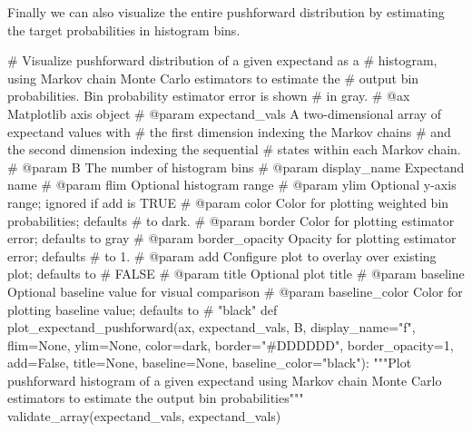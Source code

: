 \documentclass[
  letterpaper,
  DIV=11,
  numbers=noendperiod]{scrartcl}
\newenvironment{Shaded}{\begin{snugshade}}{\end{snugshade}}
\newcommand{\CommentTok}[1]{\textcolor[rgb]{0.37,0.37,0.37}{#1}}
\newcommand{\DecValTok}[1]{\textcolor[rgb]{0.68,0.00,0.00}{#1}}
\newcommand{\KeywordTok}[1]{\textcolor[rgb]{0.00,0.23,0.31}{#1}}
\newcommand{\NormalTok}[1]{\textcolor[rgb]{0.00,0.23,0.31}{#1}}
\newcommand{\OperatorTok}[1]{\textcolor[rgb]{0.37,0.37,0.37}{#1}}
\newcommand{\StringTok}[1]{\textcolor[rgb]{0.13,0.47,0.30}{#1}}
\newcommand{\VariableTok}[1]{\textcolor[rgb]{0.07,0.07,0.07}{#1}}
\begin{document}
Finally we can also visualize the entire pushforward distribution by
estimating the target probabilities in histogram bins.

\begin{Shaded}
\begin{Highlighting}[]
\CommentTok{\# Visualize pushforward distribution of a given expectand as a}
\CommentTok{\# histogram, using Markov chain Monte Carlo estimators to estimate the}
\CommentTok{\# output bin probabilities.  Bin probability estimator error is shown}
\CommentTok{\# in gray.}
\CommentTok{\# @ax Matplotlib axis object}
\CommentTok{\# @param expectand\_vals A two{-}dimensional array of expectand values with}
\CommentTok{\#                       the first dimension indexing the Markov chains}
\CommentTok{\#                       and the second dimension indexing the sequential}
\CommentTok{\#                       states within each Markov chain.}
\CommentTok{\# @param B The number of histogram bins}
\CommentTok{\# @param display\_name Expectand name}
\CommentTok{\# @param flim Optional histogram range}
\CommentTok{\# @param ylim Optional y{-}axis range; ignored if add is TRUE}
\CommentTok{\# @param color Color for plotting weighted bin probabilities; defaults}
\CommentTok{\#              to dark.}
\CommentTok{\# @param border Color for plotting estimator error; defaults to gray}
\CommentTok{\# @param border\_opacity Opacity for plotting estimator error; defaults}
\CommentTok{\#                       to 1.}
\CommentTok{\# @param add Configure plot to overlay over existing plot; defaults to}
\CommentTok{\#            FALSE}
\CommentTok{\# @param title Optional plot title}
\CommentTok{\# @param baseline Optional baseline value for visual comparison}
\CommentTok{\# @param baseline\_color Color for plotting baseline value; defaults to}
\CommentTok{\#                       "black"}
\KeywordTok{def}\NormalTok{ plot\_expectand\_pushforward(ax, expectand\_vals, B, display\_name}\OperatorTok{=}\StringTok{"f"}\NormalTok{,}
\NormalTok{                               flim}\OperatorTok{=}\VariableTok{None}\NormalTok{, ylim}\OperatorTok{=}\VariableTok{None}\NormalTok{,}
\NormalTok{                               color}\OperatorTok{=}\NormalTok{dark, border}\OperatorTok{=}\StringTok{"\#DDDDDD"}\NormalTok{,}
\NormalTok{                               border\_opacity}\OperatorTok{=}\DecValTok{1}\NormalTok{,}
\NormalTok{                               add}\OperatorTok{=}\VariableTok{False}\NormalTok{, title}\OperatorTok{=}\VariableTok{None}\NormalTok{,}
\NormalTok{                               baseline}\OperatorTok{=}\VariableTok{None}\NormalTok{, baseline\_color}\OperatorTok{=}\StringTok{"black"}\NormalTok{):}
  \CommentTok{"""Plot pushforward histogram of a given expectand using Markov chain}
\CommentTok{     Monte Carlo estimators to estimate the output bin probabilities"""}
\NormalTok{  validate\_array(expectand\_vals, }\StringTok{\textquotesingle{}expectand\_vals\textquotesingle{}}\NormalTok{)}
    

\end{Highlighting}
\end{Shaded}
\end{document}
